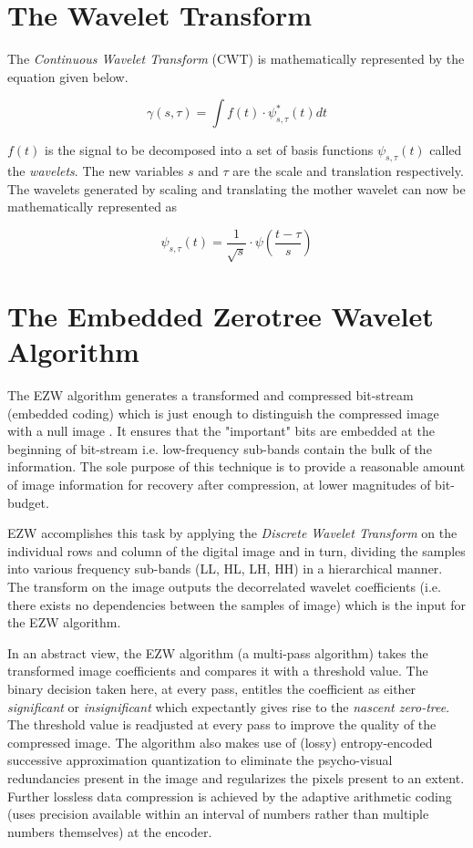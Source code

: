 \documentclass[./A14_Report.tex]{subfiles}
\begin{document}
\section{The Wavelet Transform}%
\label{sec:the_wavelet_transform}

The \textit{Continuous Wavelet Transform} (CWT) is mathematically represented by the
equation given below.

\[\gamma(s, \tau) = \int f(t)\cdot\psi^{*}_{s, \tau}(t)dt\]

\(f(t)\) is the signal to be decomposed into a set of basis functions \(\psi_{s,\tau}(t)\)
called the \textit{wavelets}. The new variables \(s\) and $\tau$ are the scale and translation
respectively. The wavelets generated by scaling and translating the mother wavelet
can now be mathematically represented as

$$\psi_{s,\tau}(t)=\frac{1}{\sqrt{s}}\cdot\psi(\frac{t-\tau}{s})$$

\section{The Embedded Zerotree Wavelet Algorithm}%
\label{sec:the_embedded_zerotree_wavelet_algorithm}

The EZW algorithm generates a transformed and compressed bit-stream (embedded
coding) which is just enough to distinguish the compressed image with a null
image \cite{shap1993}. It ensures that the "important" bits are embedded at the
beginning of bit-stream i.e. low-frequency sub-bands contain the bulk of the
information. The sole purpose of this technique is to provide a reasonable
amount of image information for recovery after compression, at lower magnitudes
of bit-budget.

\par

EZW accomplishes this task by applying the \textit{Discrete Wavelet Transform}
on the individual rows and column of the digital image and in turn, dividing
the samples into various frequency sub-bands (LL, HL, LH, HH) in a hierarchical
manner. The transform on the image outputs the decorrelated wavelet
coefficients (i.e. there exists no dependencies between the samples of image)
which is the input for the EZW algorithm.

\par

In an abstract view, the EZW algorithm (a multi-pass algorithm) takes the
transformed image coefficients and compares it with a threshold value. The
binary decision taken here, at every pass, entitles the coefficient as either
\textit{significant} or \textit{insignificant} which expectantly gives rise to
the \textit{nascent zero-tree}. The threshold value is readjusted at every pass
to improve the quality of the compressed image. The algorithm also makes use of
(lossy) entropy-encoded successive approximation quantization to eliminate the
psycho-visual redundancies present in the image and regularizes the pixels
present to an extent. Further lossless data compression is achieved by the
adaptive arithmetic coding (uses precision available within an interval of
numbers rather than multiple numbers themselves) at the encoder.
\end{document}
